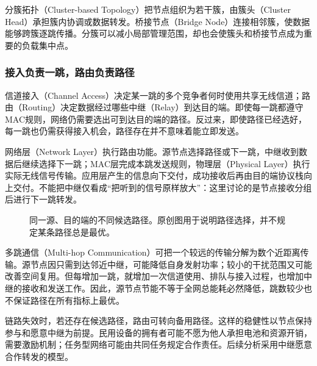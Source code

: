 分簇拓扑（Cluster-based Topology）把节点组织为若干簇，由簇头（Cluster Head）承担簇内协调或数据转发。桥接节点（Bridge Node）连接相邻簇，使数据能够跨簇逐跳传播。分簇可以减小局部管理范围，却也会使簇头和桥接节点成为重要的负载集中点。

\subsubsection{接入负责一跳，路由负责路径}

信道接入（Channel Access）决定某一跳的多个竞争者何时使用共享无线信道；路由（Routing）决定数据经过哪些中继（Relay）到达目的端。即使每一跳都遵守MAC规则，网络仍需要选出可到达目的端的路径。反过来，即使路径已经选好，每一跳也仍需获得接入机会，路径存在并不意味着能立即发送。

网络层（Network Layer）执行路由功能。源节点选择路径或下一跳，中继收到数据后继续选择下一跳；MAC层完成本跳发送规则，物理层（Physical Layer）执行实际无线信号传输。应用层产生的信息向下交付，成功接收后再由目的端协议栈向上交付。不能把中继仅看成“把听到的信号原样放大”：这里讨论的是节点接收分组后进行下一跳转发。

\begin{figure}[htbp]
\centering
{}
\caption{同一源、目的端的不同候选路径。原创图用于说明路径选择，并不规定某条路径总是最优。}
\label{fig:p4-routes}
\end{figure}

多跳通信（Multi-hop Communication）可把一个较远的传输分解为数个近距离传输。源节点因只需到达邻近中继，可能降低自身发射功率；较小的干扰范围又可能改善空间复用。但每增加一跳，就增加一次信道使用、排队与接入过程，也增加中继的接收和发送工作。因此，源节点节能不等于全网总能耗必然降低，跳数较少也不保证路径在所有指标上最优。

链路失效时，若还存在候选路径，路由可转向备用路径。这样的稳健性以节点保持参与和愿意中继为前提。民用设备的拥有者可能不愿为他人承担电池和资源开销，需要激励机制；任务型网络可能由共同任务规定合作责任。后续分析采用中继愿意合作转发的模型。

